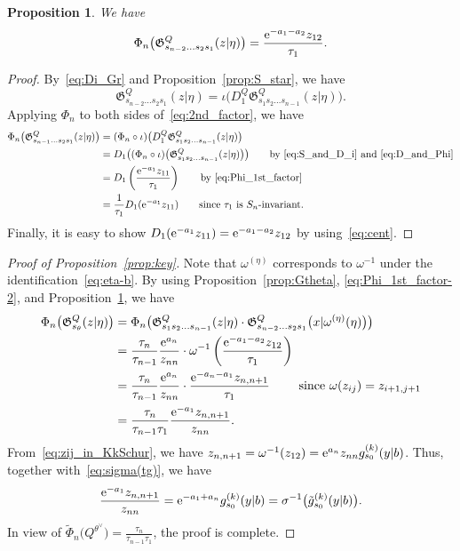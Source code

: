\documentclass[pdftex]{sigma}
\numberwithin{equation}{section}
\newcommand{\Gro}[1]{\mathfrak{G}^Q_{#1}}
\newtheorem{Proposition}[Theorem]{Proposition}
\theoremstyle{definition}
\begin{document}
\begin{Proposition}\label{prop:Phi_n_2nd_factor}
We have
\[%
\Phi_n\bigl(\Gro{s_{n-2}\dots s_2s_{1}}(z|\eta)\bigr)=\frac{{\rm e}^{-a_1-a_2}z_{12}}{\tau_1}.
\]
\end{Proposition}
\begin{proof}
By~\eqref{eq:Di_Gr} and Proposition~\ref{prop:S_star}, we have
\begin{equation}
\Gro{s_{n-2}\dots s_2s_{1}}(z|\eta)
=
\iota\bigl(D_1^{Q}\Gro{s_{1}s_2\dots s_{n-1}}(z|\eta)\bigr).\label{eq:2nd_factor}
\end{equation}
Applying
${\Phi}_n$ to both sides of~\eqref{eq:2nd_factor}, we have
\begin{align*}
\Phi_n\bigl(\Gro{s_{n-1}\dots s_2s_{1}}(z|\eta)\bigr)
&=(\Phi_n\circ \iota)\bigl(D_1^{Q}\Gro{s_{1}s_2\dots s_{n-1}}(z|\eta)\bigr) \\
&=
D_1\bigl(
(\Phi_n\circ \iota)\bigl(\Gro{s_{1}s_2\dots s_{n-1}}(z|\eta)\bigr)
\bigr)\qquad\text{by~\eqref{eq:S_and_D_i} and~\eqref{eq:D_and_Phi}}\\
&=D_1\left(
\frac{{\rm e}^{-a_1}z_{11}}{\tau_1}
\right)\qquad \text{by
\eqref{eq:Phi_1st_factor}}\\
&=
\frac{1}{\tau_1}
D_1({{\rm e}^{-a_1}z_{11}})
\qquad \text{since $\tau_1$ is $S_n$-invariant.}
\end{align*}
Finally, it is easy to show
$D_1({\rm e}^{-a_1}z_{11})={{\rm e}^{-a_1-a_2}z_{12}}$
by using~\eqref{eq:cent}.
\end{proof}

\begin{proof}[Proof of Proposition~\ref{prop:key}]
Note that $\omega^{(\eta)}$ corresponds to $\omega^{-1}$
under the identification~\eqref{eq:eta-b}.
By using Proposition~\ref{prop:Gtheta}, \eqref{eq:Phi_1st_factor-2}, and
Proposition~\ref{prop:Phi_n_2nd_factor}, we have
\begin{align*}
\Phi_n
\bigl(\Gro{s_{\theta}}(z|\eta)\bigr)
&=
\Phi_n
\bigl(\Gro{s_1s_2\dots s_{n-1}}(z|\eta)\cdot \Gro{s_{n-2}\dots s_2s_1}\bigl(x|\omega^{(\eta)}(\eta)\bigr)
\bigr)\\
&=
\frac{\tau_n}{\tau_{n-1}}
\frac{{\rm e}^{a_n}}{z_{nn}}
\cdot
\omega^{-1}
\left(
\frac{{\rm e}^{-a_1-a_2}z_{12}}{\tau_1}
\right)\\
&=
\frac{\tau_n}{\tau_{n-1}}
\frac{{\rm e}^{a_n}}{z_{nn}}
\cdot
\frac{{\rm e}^{-a_n-a_1}z_{n,n+1}}{\tau_1}
\qquad\text{
since $\omega(z_{ij})=z_{i+1,j+1}$}
\\
&=
\frac{\tau_n}{\tau_{n-1}\tau_1}
\frac{{\rm e}^{-a_1}z_{n,n+1}}{z_{nn}}.
\end{align*}
From~\eqref{eq:zij_in_KkSchur},
we have
$z_{n,n+1}=\omega^{-1}(z_{12})={\rm e}^{a_n}z_{nn}g_{s_0}^{(k)}(y|b)$.
Thus, together with~\eqref{eq:sigma(tg)}, we have
\[
\frac{{\rm e}^{-a_1}z_{n,n+1}}{z_{nn}}
={\rm e}^{-a_1+a_n}g_{s_0}^{(k)}(y|b)
=\sigma^{-1}\bigl(\tilde{g}_{s_0}^{(k)}(y|b)\bigr).
\]
In view of
$
\tilde{\Phi}_n\bigl(Q^{\theta^\vee}\bigr)=
\frac{\tau_n}{\tau_{n-1}\tau_1}$,
the proof is complete.
\end{proof}
\end{document}
